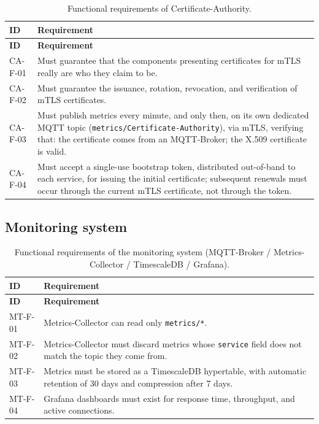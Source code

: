\begin{longtable}{p{2.6cm} p{\dimexpr\linewidth-2.6cm-4\tabcolsep\relax}}
\caption{Functional requirements of Certificate-Authority.} \\
\hline
\textbf{ID} & \textbf{Requirement} \\
\hline
\endfirsthead
\hline
\textbf{ID} & \textbf{Requirement} \\
\hline
\endhead
\hline
\endfoot
\hline
\endlastfoot
CA-F-01 & Must guarantee that the components presenting certificates for mTLS really are who they claim to be. \\
CA-F-02 & Must guarantee the issuance, rotation, revocation, and verification of mTLS certificates. \\
CA-F-03 & Must publish metrics every minute, and only then, on its own dedicated MQTT topic (\texttt{metrics/Certificate-Authority}), via mTLS, verifying that: the certificate comes from an MQTT-Broker; the X.509 certificate is valid. \\
CA-F-04 & Must accept a single-use bootstrap token, distributed out-of-band to each service, for issuing the initial certificate; subsequent renewals must occur through the current mTLS certificate, not through the token. \\
\end{longtable}

\subsection{Monitoring system}

\begin{longtable}{p{2.6cm} p{\dimexpr\linewidth-2.6cm-4\tabcolsep\relax}}
\caption{Functional requirements of the monitoring system (MQTT-Broker / Metrics-Collector / TimescaleDB / Grafana).} \\
\hline
\textbf{ID} & \textbf{Requirement} \\
\hline
\endfirsthead
\hline
\textbf{ID} & \textbf{Requirement} \\
\hline
\endhead
\hline
\endfoot
\hline
\endlastfoot
MT-F-01 & Metrics-Collector can read only \texttt{metrics/*}. \\
MT-F-02 & Metrics-Collector must discard metrics whose \texttt{service} field does not match the topic they come from. \\
MT-F-03 & Metrics must be stored as a TimescaleDB hypertable, with automatic retention of 30 days and compression after 7 days. \\
MT-F-04 & Grafana dashboards must exist for response time, throughput, and active connections. \\
\end{longtable}

